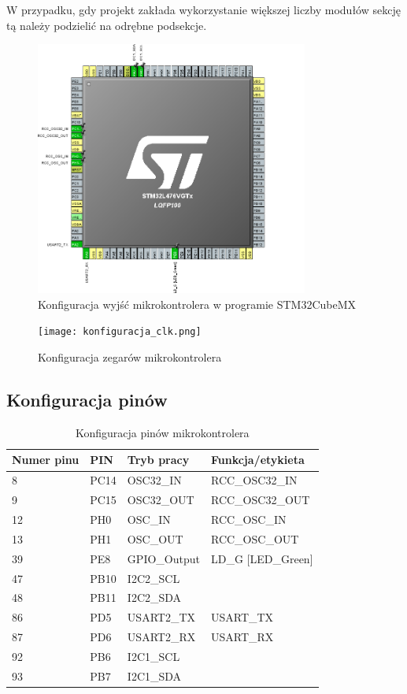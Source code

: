 \documentclass[10pt, a4paper]{article}
\begin{document}
W przypadku, gdy projekt zakłada wykorzystanie większej liczby modułów
sekcję tą należy podzielić na odrębne podsekcje.

\begin{figure}[H]
	\centering
	\includegraphics[width=0.8\textwidth]{konfiguracja_mcu.png}
	\caption{Konfiguracja wyjść mikrokontrolera w programie STM32CubeMX}
	\label{fig:KonfiguracjaMikrokontrolera}
\end{figure}

\newpage
\begin{figure}[H]
	\centering
	\texttt{[image: konfiguracja\_clk.png]}
	\caption{Konfiguracja zegarów mikrokontrolera}
	\label{fig:KonfiguracjaZegara}
\end{figure}

\subsection{Konfiguracja pinów}

\begin{table}[H]
	\centering
	\begin{tabular}{|l|l|l|l|}
		\hline
		Numer pinu	&	PIN & Tryb pracy & Funkcja/etykieta\\
		\hline
		8&	PC14 & OSC32\_IN &	RCC\_OSC32\_IN	\\
		9&	PC15 & OSC32\_OUT &	RCC\_OSC32\_OUT	\\
		12&	PH0 & OSC\_IN &	RCC\_OSC\_IN	\\
		13&	PH1 & OSC\_OUT &	RCC\_OSC\_OUT	\\
		39&	PE8 &	GPIO\_Output&	LD\_G [LED\_Green] \\
		47&	PB10 &	I2C2\_SCL&	\\
		48&	PB11 &	I2C2\_SDA&	\\
		86&	PD5 &	USART2\_TX&	USART\_TX\\
		87&	PD6 &	USART2\_RX&	USART\_RX\\
		92&	PB6 &	I2C1\_SCL&	\\
		93&	PB7 &	I2C1\_SDA&	\\
		\hline
	\end{tabular}
	\caption{Konfiguracja pinów mikrokontrolera}
	\label{tab:PINOUT}	
\end{table}
\end{document}
